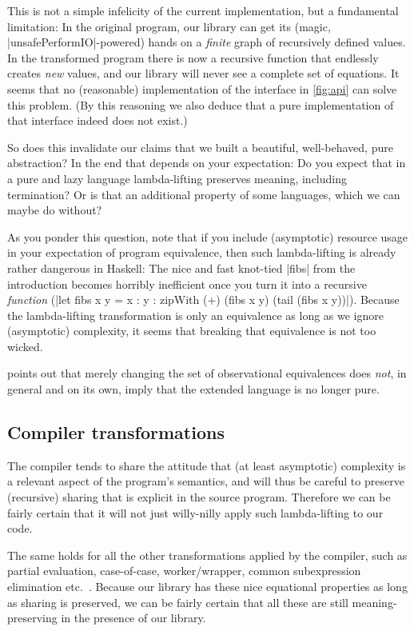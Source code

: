 \documentclass[manuscript,review,screen,acmsmall]{acmart}
\begin{document}
This is not a simple infelicity of the current implementation, but a fundamental limitation: In the original program, our library can get its (magic, |unsafePerformIO|-powered) hands on a \emph{finite} graph of recursively defined values. In the transformed program there is now a recursive function that endlessly creates \emph{new} values, and our library will never see a complete set of equations. It seems that no (reasonable) implementation of the interface in \cref{fig:api} can solve this problem. (By this reasoning we also deduce that a pure implementation of that interface indeed does not exist.)

So does this invalidate our claims that we built a beautiful, well-behaved, pure abstraction? In the end that depends on your expectation: Do you expect that in a pure and lazy language lambda-lifting preserves meaning, including termination? Or is that an additional property of some languages, which we can maybe do without?

As you ponder this question, note that if you include (asymptotic) resource usage in your expectation of program equivalence, then such lambda-lifting is already rather dangerous in Haskell: The nice and fast knot-tied |fibs| from the introduction becomes horribly inefficient once you turn it into a recursive \emph{function} (|let fibs x y = x : y  : zipWith (+) (fibs x y) (tail (fibs x y))|). Because the lambda-lifting transformation is only an equivalence as long as we ignore (asymptotic) complexity, it seems that breaking that equivalence is not too wicked.

 points out that merely changing the set of observational equivalences does \emph{not}, in general and on its own, imply that the extended language is no longer pure.

\subsection{Compiler transformations}\label{sec:comptrans}

The compiler tends to share the attitude that (at least asymptotic) complexity is a relevant aspect of the program's semantics, and will thus be careful to preserve (recursive) sharing that is explicit in the source program. Therefore we can be fairly certain that it will not just willy-nilly apply such lambda-lifting to our code.

The same holds for all the other transformations applied by the compiler, such as partial evaluation, case-of-case, worker/wrapper, common subexpression elimination etc.\ \citep{optimiser}. Because our library has these nice equational properties as long as sharing is preserved, we can be fairly certain that all these are still meaning-preserving in the presence of our library.
\end{document}
